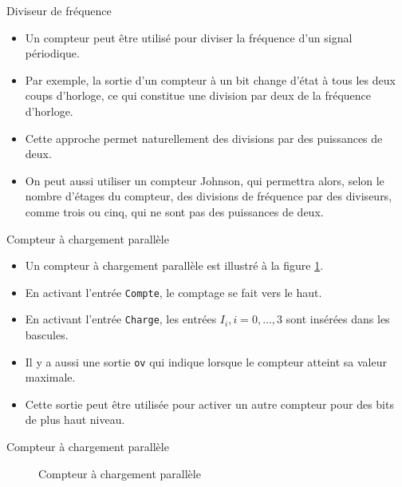 \documentclass[presentation]{beamer}
\begin{document}
\begin{frame}[label={sec:orgb4ec729}]{Diviseur de fréquence}
\begin{itemize}
\item Un compteur peut être utilisé pour diviser la fréquence d'un signal périodique.

\item Par exemple, la sortie d'un compteur à un bit change d'état à tous les deux coups d'horloge, ce qui constitue une division par deux de la fréquence d'horloge.

\item Cette approche permet naturellement des divisions par des puissances de deux.

\item On peut aussi utiliser un compteur Johnson, qui permettra alors, selon le nombre d'étages du compteur, des divisions de fréquence par des diviseurs, comme trois ou cinq, qui ne sont pas des puissances de deux.
\end{itemize}
\end{frame}

\begin{frame}[label={sec:org5f9ac2e},fragile]{Compteur à chargement parallèle}
 \begin{itemize}
\item Un compteur à chargement parallèle est illustré à la figure \ref{fig:org26c58c2}.

\item En activant l'entrée \texttt{Compte}, le comptage se fait vers le haut.

\item En activant l'entrée \texttt{Charge}, les entrées \(I_i, i=0, \ldots, 3\) sont insérées dans les bascules.

\item Il y a aussi une sortie \texttt{ov} qui indique lorsque le compteur atteint sa valeur maximale.

\item Cette sortie peut être utilisée pour activer un autre compteur pour des bits de plus haut niveau.
\end{itemize}
\end{frame}


\begin{frame}[label={sec:org4e069c9}]{Compteur à chargement parallèle}
\begin{figure}[htbp]
\centering

\caption{\label{fig:org26c58c2}Compteur à chargement parallèle}
\end{figure}
\end{frame}
\end{document}
